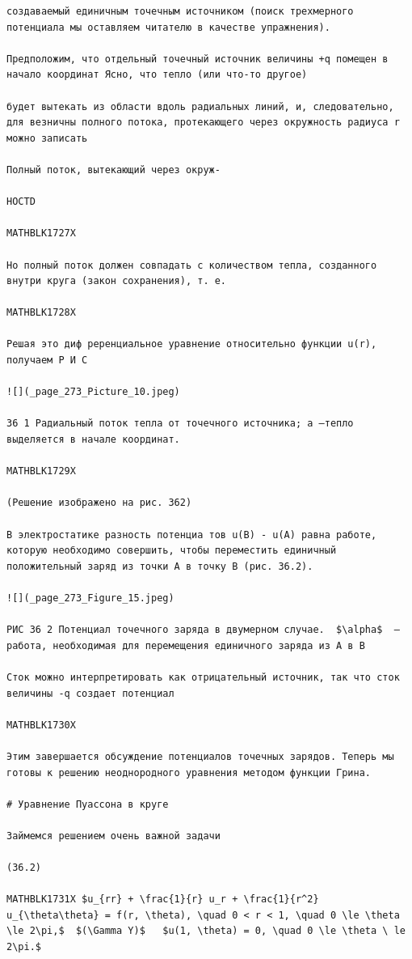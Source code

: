 \documentclass[
]{article}
\begin{document}
\begin{verbatim}
создаваемый единичным точечным источником (поиск трехмерного потенциала мы оставляем читателю в качестве упражнения).

Предположим, что отдельный точечный источник величины +q помещен в начало координат Ясно, что тепло (или что-то другое)

будет вытекать из области вдоль радиальных линий, и, следовательно, для везничны полного потока, протекающего через окружность радиуса r можно записать

Полный поток, вытекающий через окруж-

HOCTD 

MATHBLK1727X

Но полный поток должен совпадать с количеством тепла, созданного внутри круга (закон сохранения), т. е.

MATHBLK1728X

Решая это диф реренциальное уравнение относительно функции u(r), получаем Р И С

![](_page_273_Picture_10.jpeg)

36 1 Радиальный поток тепла от точечного источника; a —тепло выделяется в начале координат.

MATHBLK1729X

(Решение изображено на рис. 362)

В электростатике разность потенциа тов u(B) - u(A) равна работе, которую необходимо совершить, чтобы переместить единичный положительный заряд из точки A в точку B (рис. 36.2).

![](_page_273_Figure_15.jpeg)

РИС 36 2 Потенциал точечного заряда в двумерном случае.  $\alpha$  — работа, необходимая для перемещения единичного заряда из A в B

Сток можно интерпретировать как отрицательный источник, так что сток величины -q создает потенциал

MATHBLK1730X

Этим завершается обсуждение потенциалов точечных зарядов. Теперь мы готовы к решению неоднородного уравнения методом функции Грина.

# Уравнение Пуассона в круге

Займемся решением очень важной задачи

(36.2) 

MATHBLK1731X $u_{rr} + \frac{1}{r} u_r + \frac{1}{r^2} u_{\theta\theta} = f(r, \theta), \quad 0 < r < 1, \quad 0 \le \theta \le 2\pi,$  $(\Gamma Y)$   $u(1, \theta) = 0, \quad 0 \le \theta \ le 2\pi.$ 


\end{verbatim}
\end{document}

